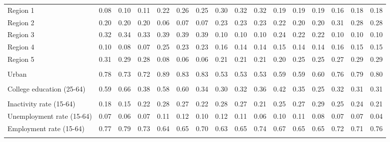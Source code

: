 \begin{tabular}{l*{15}{c}}
\\
Region 1 & 0.08 & 0.10 & 0.11 & 0.22 & 0.26 & 0.25 & 0.30 & 0.32 & 0.32 & 0.19 & 0.19 & 0.19 & 0.16 & 0.18 & 0.18 \\
Region 2 & 0.20 & 0.20 & 0.20 & 0.06 & 0.07 & 0.07 & 0.23 & 0.23 & 0.23 & 0.22 & 0.20 & 0.20 & 0.31 & 0.28 & 0.28 \\
Region 3 & 0.32 & 0.34 & 0.33 & 0.39 & 0.39 & 0.39 & 0.10 & 0.10 & 0.10 & 0.24 & 0.22 & 0.22 & 0.10 & 0.10 & 0.10 \\
Region 4 & 0.10 & 0.08 & 0.07 & 0.25 & 0.23 & 0.23 & 0.16 & 0.14 & 0.14 & 0.15 & 0.14 & 0.14 & 0.16 & 0.15 & 0.15  \\
Region 5 & 0.31 & 0.29 & 0.28 & 0.08 & 0.06 & 0.06 & 0.21 & 0.21 & 0.21 & 0.20 & 0.25 & 0.25 & 0.27 & 0.29 & 0.29 \\
\\
Urban & 0.78 & 0.73 & 0.72 & 0.89 & 0.83 & 0.83 & 0.53 & 0.53 & 0.53 & 0.59 & 0.59 & 0.60 & 0.76 & 0.79 & 0.80 \\
\\
College education (25-64) & 0.59 & 0.66 & 0.38 & 0.58 & 0.60 & 0.34 & 0.30 & 0.32 & 0.36 & 0.42 & 0.35 & 0.25 & 0.32 & 0.31 & 0.31\\
\\
Inactivity rate (15-64) & 0.18 & 0.15 & 0.22 & 0.28 & 0.27 & 0.22 & 0.28 & 0.27 & 0.21 & 0.25 & 0.27 & 0.29 & 0.25 & 0.24 & 0.21 \\
Unemployment rate (15-64) & 0.07 & 0.06 & 0.07 & 0.11 & 0.12 & 0.10 & 0.12 & 0.11 & 0.06 & 0.10 & 0.11 & 0.08 & 0.07 & 0.07 & 0.04 \\
Employment rate (15-64) & 0.77 & 0.79 & 0.73 & 0.64 & 0.65 & 0.70 & 0.63 & 0.65 & 0.74 & 0.67 & 0.65 & 0.65 & 0.72 & 0.71 & 0.76 \\
\\
\bottomrule
\end{tabular}